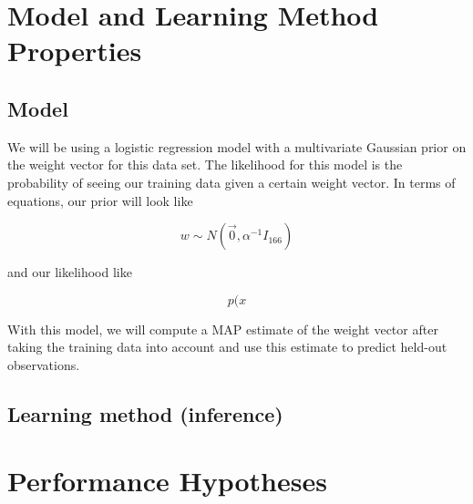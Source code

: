 \documentclass[12pt]{article}
\begin{document}
\section{Model and Learning Method Properties}
  

\subsection{Model}

We will be using a logistic regression model with a multivariate Gaussian prior on the weight vector for this data set. The likelihood for this model is the probability of seeing our training data given a certain weight vector. In terms of equations, our prior will look like

\begin{equation}
    w \sim N(\vec{0}, \alpha^{-1}I_{166})
\end{equation}

and our likelihood like

\begin{equation}
    p(x
\end{equation}


With this model, we will compute a MAP estimate of the weight vector after taking the training data into account and use this estimate to predict held-out observations.




\subsection{Learning method (inference)}

\section{Performance Hypotheses}
\end{document}
